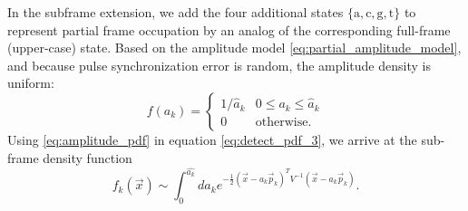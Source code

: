 \documentclass[10pt]{article}
\newcommand{\half}{\frac{1}{2}}
\newcommand{\pvecT}{\vec{p}_k^{\;T}}
\newcommand{\pA}{\ensuremath{\text{a}}}
\newcommand{\pC}{\ensuremath{\text{c}}}
\newcommand{\pG}{\ensuremath{\text{g}}}
\newcommand{\pT}{\ensuremath{\text{t}}}
\begin{document}
In the subframe extension,
we add the four additional states $\{\pA, \pC, \pG, \pT\}$ to represent partial frame occupation by an analog of the corresponding full-frame (upper-case) state.
Based on the amplitude model \eqref{eq:partial_amplitude_model}, and because pulse synchronization error is random,
the amplitude density is uniform:
\begin{equation}
\label{eq:amplitude_pdf}
f(a_k) = \left\{
		\begin{array}{ll}
		1/\hat{a}_k & 0 \leq a_k \leq \hat{a}_k \\
		0 & \mbox{otherwise.}
		\end{array} \right. 
\end{equation}
Using \eqref{eq:amplitude_pdf} in equation \eqref{eq:detect_pdf_3}, we arrive at the sub-frame density function
\begin{equation}
\label{eq:sub_density}
f_k(\vec{x}) \sim \int_0^{\hat{a_k}}{da_k e^{-\half(\vec{x}-a_k\vec{p}_k)^T V^{-1} (\vec{x}-a_k\vec{p}_k)}}. 
\end{equation}
%
\end{document}

